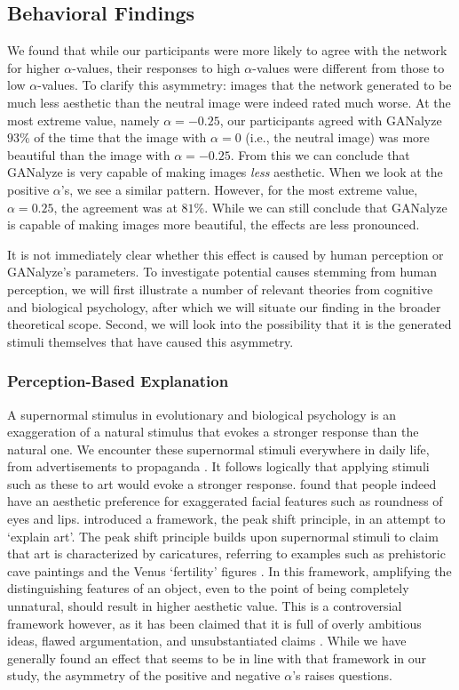 \documentclass[../main.tex]{subfiles}
\begin{document}
\subsection{Behavioral Findings}
We found that while our participants were more likely to agree with the network for higher $\alpha$-values, their responses to high $\alpha$-values were different from those to low $\alpha$-values. To clarify this asymmetry: images that the network generated to be much less aesthetic than the neutral image were indeed rated much worse. At the most extreme value, namely $\alpha = -0.25$, our participants agreed with GANalyze $93\%$ of the time that the image with $\alpha = 0$ (i.e., the neutral image) was more beautiful than the image with $\alpha = -0.25$. From this we can conclude that GANalyze is very capable of making images \textit{less} aesthetic. When we look at the positive $\alpha$'s, we see a similar pattern. However, for the most extreme value, $\alpha = 0.25$, the agreement was at $81\%$. While we can still conclude that GANalyze is capable of making images more beautiful, the effects are less pronounced. 

It is not immediately clear whether this effect is caused by human perception or GANalyze's parameters. To investigate potential causes stemming from human perception, we will first illustrate a number of relevant theories from cognitive and biological psychology, after which we will situate our finding in the broader theoretical scope. Second, we will look into the possibility that it is the generated stimuli themselves that have caused this asymmetry.

\subsubsection{Perception-Based Explanation}
A supernormal stimulus in evolutionary and biological psychology is an exaggeration of a natural stimulus that evokes a stronger response than the natural one. We encounter these supernormal stimuli everywhere in daily life, from advertisements to propaganda \parencite{barrett2010supernormal}. It follows logically that applying stimuli such as these to art would evoke a stronger response. \textcite{costa2006aesthetic} found that people indeed have an aesthetic preference for exaggerated facial features such as roundness of eyes and lips. \textcite{ramachandran1999science} introduced a framework, the peak shift principle, in an attempt to `explain art'. The peak shift principle builds upon supernormal stimuli to claim that art is characterized by caricatures, referring to examples such as prehistoric cave paintings and the Venus `fertility' figures \parencite{ramachandran1999science}. In this framework, amplifying the distinguishing features of an object, even to the point of being completely unnatural, should result in higher aesthetic value. This is a controversial framework however, as it has been claimed that it is full of overly ambitious ideas, flawed argumentation, and unsubstantiated claims \parencite{hyman2010art}. While we have generally found an effect that seems to be in line with that framework in our study, the asymmetry of the positive and negative $\alpha$'s raises questions. 
\end{document}
